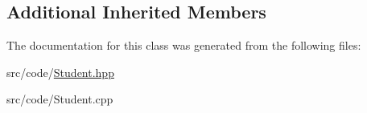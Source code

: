 \subsection*{Additional Inherited Members}


The documentation for this class was generated from the following files\+:\begin{DoxyCompactItemize}
\item 
src/code/\mbox{\hyperlink{_student_8hpp}{Student.\+hpp}}\item 
src/code/Student.\+cpp\end{DoxyCompactItemize}
